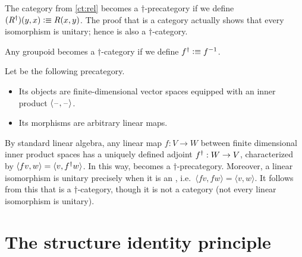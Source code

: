 \documentclass[hott-all.tex]{subfiles}
\begin{document}
\begin{eg}\label{ct:rel-dagger-cat}
  The category \urel from \cref{ct:rel} becomes a $\dagger$-pre\-cat\-e\-go\-ry if we define $({R}^{\dagger})(y,x) \vcentcolon\equiv R(x,y)$.
  The proof that \urel is a category actually shows that every isomorphism is unitary; hence \urel is also a $\dagger$-category.
\end{eg}

\begin{eg}\label{ct:groupoid-dagger-cat}
  Any groupoid becomes a $\dagger$-category if we define ${f}^{\dagger} \vcentcolon\equiv {f}^{-1}$.
\end{eg}

\begin{eg}\label{ct:hilb}
  Let \uhilb be the following precategory.
  \begin{itemize}
  \item Its objects are finite-dimensional  vector spaces equipped with an inner product $\langle \mathord{\hspace{1pt}\text{--}\hspace{1pt}},\mathord{\hspace{1pt}\text{--}\hspace{1pt}}\rangle$.
  \item Its morphisms are arbitrary linear maps.
  \end{itemize}
  By standard linear algebra, any linear map $f:V\to W$ between finite
  dimensional inner product spaces has a uniquely defined adjoint ${f}^{\dagger}:W\to V$, characterized by $\langle f v,w\rangle = \langle v,{f}^{\dagger} w\rangle$.
  In this way, \uhilb becomes a $\dagger$-precategory.
  Moreover, a linear isomorphism is unitary precisely when it is an ,
  i.e.\ $\langle fv,fw\rangle = \langle v,w\rangle$.
  It follows from this that \uhilb is a $\dagger$-category, though it is not a category (not every linear isomorphism is unitary).
\end{eg}



\section{The structure identity principle}
\label{sec:sip}
\end{document}
